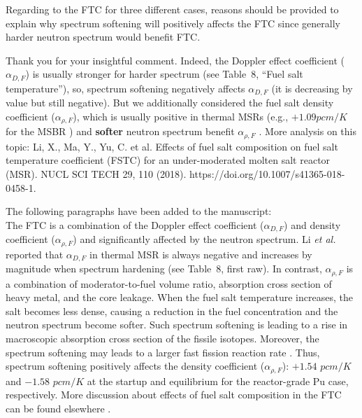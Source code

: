 \documentclass[answers,11pt]{exam}
\begin{document}
\begin{questions}
        \question Regarding to the FTC for three different cases, reasons should be provided to explain why spectrum softening will positively affects the FTC since generally harder neutron spectrum would benefit FTC.
        \begin{solution}
                Thank you for your insightful comment.  Indeed, the Doppler 
                effect coefficient ($\alpha_{D,F}$) is usually stronger for 
                harder spectrum (see Table~8, ``Fuel salt temperature''), so, 
                spectrum softening negatively affects $\alpha_{D,F}$ (it is 
                decreasing by value but still negative). But we additionally 
                considered the fuel salt density coefficient 
                ($\alpha_{\rho,F}$), which is usually positive in thermal MSRs 
                (e.g., $+ 1.09 pcm/K$ for the \gls{MSBR}           
                \cite{robertson_conceptual_1971}) and \textbf{softer} neutron 
                spectrum benefit $\alpha_{\rho,F}$ \cite{li_effects_2018-1, 
                rykhlevskii2019modeling}. More analysis on this topic:
            Li, X., Ma, Y., Yu, C. et al. Effects of fuel salt composition on 
            fuel salt temperature coefficient (FSTC) for an under-moderated 
            molten salt reactor (MSR). NUCL SCI TECH 29, 110 (2018). 
            https://doi.org/10.1007/s41365-018-0458-1.     
	            
	            The following paragraphs have been added to the manuscript:\\

	            The \gls{FTC} is a combination of the Doppler effect 
	            coefficient ($\alpha_{D,F}$) and density coefficient 
	            ($\alpha_{\rho,F}$) and significantly affected by the neutron 
	            spectrum. Li \emph{et al.} reported that 	            
	            $\alpha_{D,F}$ in thermal \gls{MSR} is always negative and 
	            increases by magnitude when spectrum hardening (see Table~8, 
	            first raw). In contrast, $\alpha_{\rho,F}$ is a combination of 
	            moderator-to-fuel volume ratio, absorption cross section of 
	            heavy metal, and the core leakage. When the fuel salt 
	            temperature increases, the salt becomes less dense, 
	            causing a reduction in the fuel concentration and the neutron 
	            spectrum become softer. Such spectrum softening is leading to 
	            a rise in macroscopic absorption cross section of the fissile 
	            isotopes. Moreover, the spectrum softening may leads to 
	            a larger fast fission reaction rate \cite{li_effects_2018-1}. 
	            Thus, spectrum softening positively affects the density 
	            coefficient ($\alpha_{\rho,F}$): $+1.54$ $pcm/K$ and $-1.58$ 
	            $pcm/K$ at the startup and equilibrium for the 
	            reactor-grade Pu case, respectively. More discussion about 
	            effects of fuel salt composition in the \gls{FTC} can be found 
	            elsewhere 
	            \cite{li_effects_2018-1}.
        \end{solution}


\end{questions}
\end{document}
